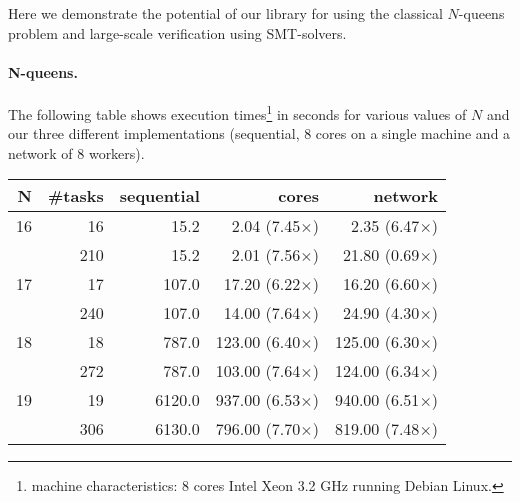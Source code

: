 \documentclass[preprint]{sigplanconf}
\begin{document}
Here we demonstrate the potential of our library for using the
classical $N$-queens problem and large-scale verification using SMT-solvers.

\paragraph{N-queens.} 
The following table shows execution times\footnote{machine
  characteristics: 8 cores Intel Xeon 3.2 GHz running Debian Linux.} 
in seconds for various values of $N$
and our three different implementations (sequential, 8 cores on a
single machine and a network of 8 workers).
\begin{center}
  \begin{tabular}{|r|r|r|r|r|}
    \hline
    N & \#tasks  & sequential& cores                 & network 
    \\\hline\hline
    16 &   16    &  15.2     &   2.04 (7.45$\times$) &  2.35  (6.47$\times$) 
    \\\hline
       &  210    &  15.2     &   2.01 (7.56$\times$) & 21.80  (0.69$\times$)
    \\\hline
    17 &   17    & 107.0     &  17.20 (6.22$\times$) & 16.20  (6.60$\times$)
    \\\hline
       &  240    & 107.0     &  14.00 (7.64$\times$) & 24.90  (4.30$\times$)
    \\\hline
    18 &   18    & 787.0     & 123.00 (6.40$\times$) & 125.00 (6.30$\times$)  
    \\\hline
       &  272    & 787.0     & 103.00 (7.64$\times$) & 124.00 (6.34$\times$)  
    \\\hline
    19 &   19    &6120.0     & 937.00 (6.53$\times$) & 940.00 (6.51$\times$)  
    \\\hline
       &  306    &6130.0     & 796.00 (7.70$\times$) & 819.00 (7.48$\times$)
    \\\hline
  \end{tabular}
\end{center}
\end{document}
